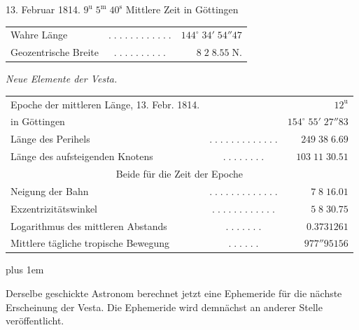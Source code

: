 \begin{center}13. Februar 1814. $9^{\mathrm u}\;5^{\mathrm m}\;40^{\mathrm s}$ Mittlere Zeit in Göttingen\end{center}
\begin{center}\fontsize{10}{12}\selectfont\setlength{\tabcolsep}{2pt}\renewcommand{\arraystretch}{1.15}\begin{tabular}{lcr}
Wahre Länge & $.\;.\;.\;.\;.\;.\;.\;.\;.\;.\;.\;.$ & $144^\circ\;34'\;54''47$\\
Geozentrische Breite & $.\;.\;.\;.\;.\;.\;.\;.\;.\;.$ & $8\;2\;8.55\;\mathrm{N.}$\\
\end{tabular}\end{center}

\emph{Neue Elemente der Vesta.}

\begin{center}\fontsize{9}{11}\selectfont\setlength{\tabcolsep}{2pt}\renewcommand{\arraystretch}{1.15}\begin{tabular}{lcr}
Epoche der mittleren Länge, 13. Febr. 1814. & & $12^{\mathrm u}$\\
in Göttingen & & $154^\circ\;55'\;27''83$\\
Länge des Perihels & $.\;.\;.\;.\;.\;.\;.\;.\;.\;.\;.\;.\;.$ & $249\;38\;6.69$\\
Länge des aufsteigenden Knotens & $.\;.\;.\;.\;.\;.\;.\;.$ & $103\;11\;30.51$\\
\multicolumn{3}{c}{Beide für die Zeit der Epoche}\\
Neigung der Bahn & $.\;.\;.\;.\;.\;.\;.\;.\;.\;.\;.\;.\;.$ & $7\;8\;16.01$\\
Exzentrizitätswinkel & $.\;.\;.\;.\;.\;.\;.\;.\;.\;.\;.\;.$ & $5\;8\;30.75$\\
Logarithmus des mittleren Abstands & $.\;.\;.\;.\;.\;.\;.$ & $0.3731261$\\
Mittlere tägliche tropische Bewegung & $.\;.\;.\;.\;.\;.$ & $977''95156$\\
\end{tabular}\end{center}

{\rightskip=0pt plus 1em \par\indent Derselbe geschickte Astronom berechnet jetzt eine Ephemeride für die nächste Erscheinung der Vesta. Die Ephemeride wird demnächst an anderer Stelle veröffentlicht.\par}
